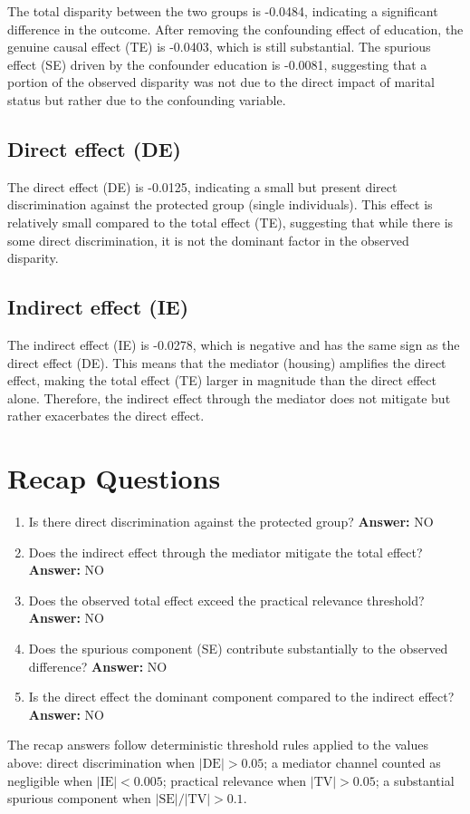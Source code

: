 \documentclass[11pt]{article}
\begin{document}
The total disparity between the two groups is -0.0484, indicating a significant difference in the outcome. After removing the confounding effect of education, the genuine causal effect (TE) is -0.0403, which is still substantial. The spurious effect (SE) driven by the confounder education is -0.0081, suggesting that a portion of the observed disparity was not due to the direct impact of marital status but rather due to the confounding variable.

\subsection{Direct effect (DE)}

The direct effect (DE) is -0.0125, indicating a small but present direct discrimination against the protected group (single individuals). This effect is relatively small compared to the total effect (TE), suggesting that while there is some direct discrimination, it is not the dominant factor in the observed disparity.

\subsection{Indirect effect (IE)}

The indirect effect (IE) is -0.0278, which is negative and has the same sign as the direct effect (DE). This means that the mediator (housing) amplifies the direct effect, making the total effect (TE) larger in magnitude than the direct effect alone. Therefore, the indirect effect through the mediator does not mitigate but rather exacerbates the direct effect.

\section{Recap Questions}

\begin{enumerate}
\item Is there direct discrimination against the protected group? \textbf{Answer:} NO
\item Does the indirect effect through the mediator mitigate the total effect? \textbf{Answer:} NO
\item Does the observed total effect exceed the practical relevance threshold? \textbf{Answer:} NO
\item Does the spurious component (SE) contribute substantially to the observed difference? \textbf{Answer:} NO
\item Is the direct effect the dominant component compared to the indirect effect? \textbf{Answer:} NO
\end{enumerate}

\vspace{1em}
\noindent\footnotesize
The recap answers follow deterministic threshold rules applied to the values above: direct discrimination when $|\mathrm{DE}| > 0.05$; a mediator channel counted as negligible when $|\mathrm{IE}| < 0.005$; practical relevance when $|\mathrm{TV}| > 0.05$; a substantial spurious component when $|\mathrm{SE}| / |\mathrm{TV}| > 0.1$.
\end{document}
